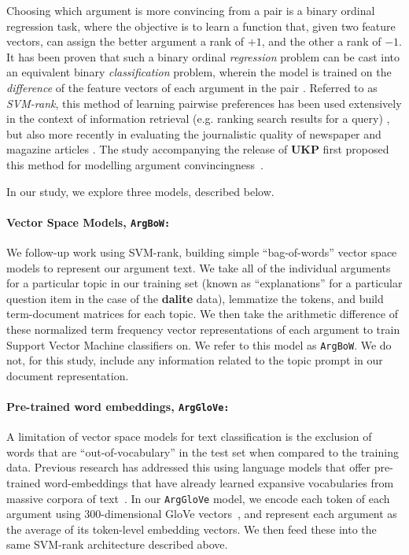 \documentclass[runningheads]{llncs}
\begin{document}
Choosing which argument is more convincing from a pair is a binary 
ordinal regression task, where the objective is to learn a function that, given 
two feature vectors, can assign the better argument a rank of $+1$, and the 
other a rank of $-1$.   
It has been proven that such a binary ordinal \textit{regression} problem can 
be cast into an equivalent binary \textit{classification} problem, wherein the 
model is trained on the \textit{difference} of the feature vectors of each 
argument in the pair \cite{herbrich_support_1999}. 
Referred to as \textit{SVM-rank}, this method of learning pairwise preferences 
has been used extensively in the context of information retrieval (e.g. ranking 
search results for a query) 
\cite{joachims_optimizing_2002}, but also more recently in evaluating the 
journalistic quality of newspaper and magazine articles \cite{louis_what_2013}.
The study accompanying the release of \textbf{UKP} first proposed this method 
for modelling argument convincingness~\cite{habernal_which_2016}.

In our study, we explore three models, described below.

\paragraph{\textbf{Vector Space Models, \tt{ArgBoW}:}}

We follow-up work using SVM-rank, building simple ``bag-of-words'' vector space 
models to represent our argument text. 
We take all of the individual arguments for a particular topic in our training 
set (known as  ``explanations'' for a particular question item in the case of 
the \textbf{dalite} data), lemmatize the tokens, and build term-document 
matrices for each topic.
We then take the arithmetic difference of these normalized term frequency 
vector representations of each argument to train Support Vector Machine 
classifiers on. 
We refer to this model as \verb|ArgBoW|.
We do not, for this study, include any information related to the topic prompt 
in our document representation.


\paragraph{\textbf{Pre-trained word embeddings, \tt{ArgGloVe}:}}
A limitation of vector space models for text classification is the exclusion of 
words that are ``out-of-vocabulary'' in the test set when compared to the 
training data.
Previous research has addressed this using language models that 
offer pre-trained word-embeddings that have already learned expansive 
vocabularies from massive corpora of 
text~\cite{habernal_which_2016}\cite{gleize_are_2019}.    
In our \verb|ArgGloVe| model, we encode each token of each argument using 
300-dimensional GloVe vectors~\cite{pennington_glove:_2014}, 
and represent each argument as the average of its token-level embedding 
vectors. 
We then feed these into the same SVM-rank architecture described above. 
\end{document}
